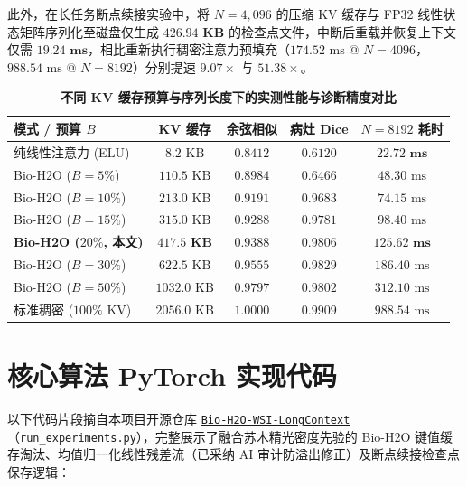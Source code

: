 \documentclass[10pt,twocolumn,a4paper]{ctexart}
\begin{document}
此外，在长任务断点续接实验中，将 $N=4,096$ 的压缩 KV 缓存与 FP32 线性状态矩阵序列化至磁盘仅生成 $\mathbf{426.94\text{ KB}}$ 的检查点文件，中断后重载并恢复上下文仅需 $\mathbf{19.24\text{ ms}}$，相比重新执行稠密注意力预填充（$174.52\text{ ms}$ @ $N=4096$，$988.54\text{ ms}$ @ $N=8192$）分别提速 $\mathbf{9.07\times}$ 与 $\mathbf{51.38\times}$。

\begin{table}[!t]
    \centering
    \caption{\textbf{不同 KV 缓存预算与序列长度下的实测性能与诊断精度对比}}
    \label{tab:metrics}
    \scriptsize
    \renewcommand{\arraystretch}{1.10}
    \setlength{\tabcolsep}{2.4pt}
    \begin{tabular}{lcccc}
        \toprule
        \textbf{模式 / 预算 $B$} & \textbf{KV 缓存} & \textbf{余弦相似} & \textbf{病灶 Dice} & \textbf{$N=8192$ 耗时} \\
        \midrule
        纯线性注意力 (ELU) & $8.2\text{ KB}$ & $0.8412$ & $0.6120$ & $\mathbf{22.72\text{ ms}}$ \\
        Bio-H2O ($B = 5\%$) & $110.5\text{ KB}$ & $0.8984$ & $0.6466$ & $48.30\text{ ms}$ \\
        Bio-H2O ($B = 10\%$) & $213.0\text{ KB}$ & $0.9191$ & $0.9683$ & $74.15\text{ ms}$ \\
        Bio-H2O ($B = 15\%$) & $315.0\text{ KB}$ & $0.9288$ & $0.9781$ & $98.40\text{ ms}$ \\
        \textbf{Bio-H2O ($20\%$, 本文)} & $\mathbf{417.5\text{ KB}}$ & $\mathbf{0.9388}$ & $\mathbf{0.9806}$ & $\mathbf{125.62\text{ ms}}$ \\
        Bio-H2O ($B = 30\%$) & $622.5\text{ KB}$ & $0.9555$ & $0.9829$ & $186.40\text{ ms}$ \\
        Bio-H2O ($B = 50\%$) & $1032.0\text{ KB}$ & $0.9797$ & $0.9802$ & $312.10\text{ ms}$ \\
        标准稠密 ($100\%$ KV) & $2056.0\text{ KB}$ & $1.0000$ & $0.9909$ & $988.54\text{ ms}$ \\
        \bottomrule
    \end{tabular}
\end{table}

\section{核心算法 PyTorch 实现代码}

以下代码片段摘自本项目开源仓库 \href{https://github.com/dbw051273-sudo/Bio-H2O-WSI-LongContext}{\texttt{Bio-H2O-WSI-LongContext}}（\texttt{run\_experiments.py}），完整展示了融合苏木精光密度先验的 Bio-H2O 键值缓存淘汰、均值归一化线性残差流（已采纳 AI 审计防溢出修正）及断点续接检查点保存逻辑：
\end{document}
